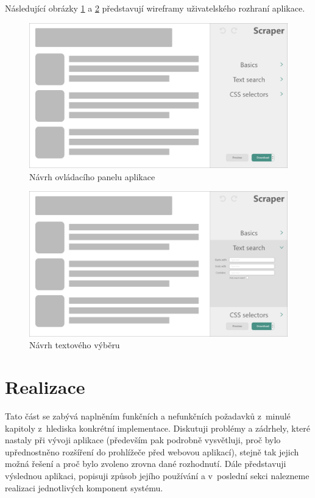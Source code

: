 \documentclass[thesis=B,czech]{FITthesis}[2012/06/26]
\begin{document}
Následující obrázky \ref{fig:scraper_main_wireframe} a \ref{fig:scraper_text_search_wireframe} představují wireframy uživatelského rozhraní aplikace.
\begin{figure}[h]
	\includegraphics[width=\linewidth]{images/main_wireframe.png}
	\caption{Návrh ovládacího panelu aplikace}
	\label{fig:scraper_main_wireframe}
\end{figure}
\begin{figure}
	\includegraphics[width=\linewidth]{images/text_search_wireframe.png}
	\caption{Návrh textového výběru}
	\label{fig:scraper_text_search_wireframe}
\end{figure}



\chapter{Realizace}
Tato část se zabývá naplněním funkčních a nefunkčních požadavků z~minulé kapitoly z~hlediska konkrétní implementace. Diskutuji problémy a zádrhely, které nastaly při vývoji aplikace (především pak podrobně vysvětluji, proč bylo upřednostněno rozšíření do prohlížeče před webovou aplikací), stejně tak jejich možná řešení a proč bylo zvoleno zrovna dané rozhodnutí. Dále představuji výslednou aplikaci, popisuji způsob jejího používání a v~poslední sekci nalezneme realizaci jednotlivých komponent systému.
\end{document}
